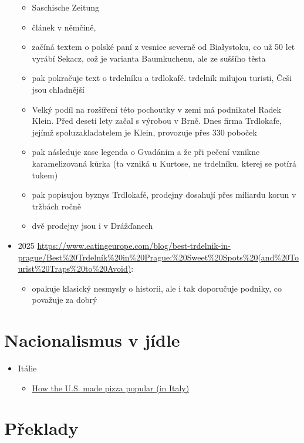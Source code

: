 \begin{itemize}
  \begin{itemize}
  \tightlist
  \item
    Saschische Zeitung
  \item
    článek v němčině,
  \item
    začíná textem o polské paní z vesnice severně od Białystoku, co už
    50 let vyrábí Sekacz, což je varianta Baumkuchenu, ale ze suššího
    těsta
  \item
    pak pokračuje text o trdelníku a trdlokafé. trdelník milujou
    turisti, Češi jsou chladnější
  \item
    Velký podíl na rozšíření této pochoutky v zemi má podnikatel Radek
    Klein. Před deseti lety začal s výrobou v Brně. Dnes firma
    Trdlokafe, jejímž spoluzakladatelem je Klein, provozuje přes 330
    poboček
  \item
    pak následuje zase legenda o Gvadánim a že při pečení vznikne
    karamelizovaná kůrka (ta vzniká u Kurtose, ne trdelníku, kterej se
    potírá tukem)
  \item
    pak popisujou byznys Trdlokafé, prodejny dosahují přes miliardu
    korun v tržbách ročně
  \item
    dvě prodejny jsou i v Drážďanech
  \end{itemize}
\item
  2025
  \url{https://www.eatingeurope.com/blog/best-trdelnik-in-prague/Best\%20Trdelník\%20in\%20Prague:\%20Sweet\%20Spots\%20(and\%20Tourist\%20Traps\%20to\%20Avoid)}:

  \begin{itemize}
  \tightlist
  \item
    opakuje klasický nesmysly o historii, ale i tak doporučuje podniky,
    co považuje za dobrý
  \end{itemize}
\end{itemize}

\section{Nacionalismus v jídle}\label{Nacionalismusux20vux20juxeddle}

\begin{itemize}
\tightlist
\item
  Itálie

  \begin{itemize}
  \tightlist
  \item
    \href{https://www.youtube.com/watch?v=iZZfwyKa0Lc}{How the U.S. made
    pizza popular (in Italy)}
  \end{itemize}
\end{itemize}
\section{Překlady}



